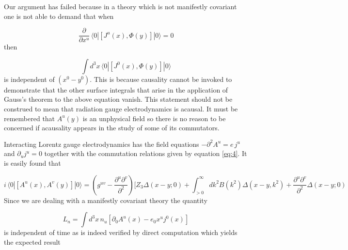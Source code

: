 \documentclass[%
  12pt,
  paper=letter,
  abstracton,
  pagesize=auto,
  version=last,
  DIV=calc
  ]{scrartcl}
\begin{document}
Our argument has failed because in a theory which is not manifestly
covariant one is not able to demand that when

\begin{equation*}
\frac{\partial}{\partial x^u}\, \langle 0|[J^u (x), \Phi (y)]|0\rangle = 0
\end{equation*}
then

\begin{equation*}
\int d^3x\, \langle 0|[J^0 (x), \Phi(y)]|0\rangle
\end{equation*}
is independent of $(x^0 - y^0)$.  This is because causality
cannot be invoked to demonstrate that the other surface integrals that
arise in the application of Gauss's theorem to the above equation
vanish.  This statement should not be construed to mean that radiation
gauge electrodynamics is acausal.  It must be remembered that $A^u
(y)$ is an unphysical field so there is no reason to be concerned if
acausality appears in the study of some of its commutators.

Interacting Lorentz gauge electrodynamics has the field
equations $-\partial^2A^u = e\, j^u$ and $\partial_uj^u=0$ together with the
commutation relations given by equation \eqref{eq:4}.  It is easily found that

\begin{equation}
\label{eq:5}
i\, \langle 0|[A^u(x), A^v(y)]|0\rangle=(g^{uv}-\frac{\partial^u \partial^v}{\partial^2})[Z_3\Delta(x-y;0)+\int^\infty_{>0} d k^2 B(k^2) \Delta(x-y, k^2)+\frac{\partial^u \partial^v}{\partial^2} \Delta(x-y;0)
\end{equation}
Since we are dealing with a manifestly covariant theory the quantity

\[L_n=\int d^3x\, n_u[\partial_0A^u(x)-e_0x^u j^{0}(x)]\]
is independent of time as is indeed verified by direct computation which
yields the expected result
\end{document}
